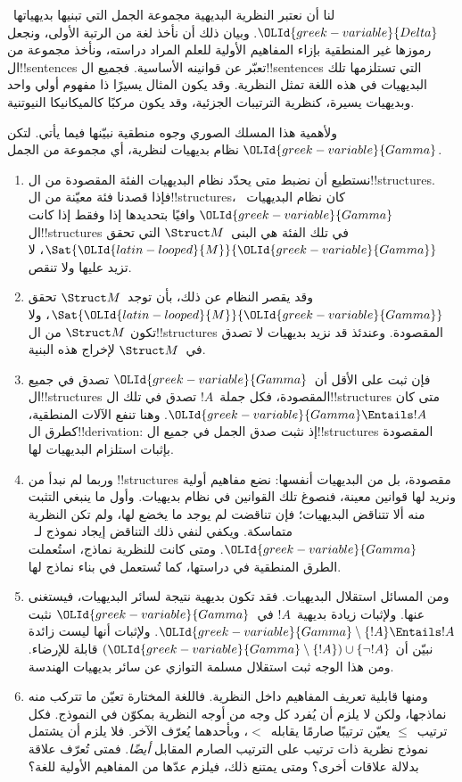 \documentclass[../../../include/open-logic-section]{subfiles}
\begin{document}
\begin{explain}
لنا أن نعتبر النظرية البديهية مجموعة الجمل التي تبنيها
بديهياتها~$\OLId{greek-variable}{Delta}$. وبيان ذلك أن نأخذ لغة من الرتبة الأولى،
ونجعل رموزها غير المنطقية بإزاء المفاهيم الأولية للعلم المراد
دراسته، ونأخذ مجموعة من ال!!{sentence}s تعبّر عن قوانينه الأساسية.
فجميع ال!!{sentence}s التي تستلزمها تلك البديهيات في هذه اللغة
تمثل النظرية. وقد يكون المثال يسيرًا ذا مفهوم أولي واحد وبديهيات
يسيرة، كنظرية الترتيبات الجزئية، وقد يكون مركبًا كالميكانيكا
النيوتنية.

ولأهمية هذا المسلك الصوري وجوه منطقية نبيّنها فيما يأتي.
لتكن $\OLId{greek-variable}{Gamma}$ نظام بديهيات لنظرية، أي مجموعة من الجمل.
\begin{enumerate}
\item نستطيع أن نضبط متى يحدّد نظام البديهيات الفئة المقصودة من
  ال!!{structure}s. فإذا قصدنا فئة معيّنة من ال!!{structure}s،
  كان نظام البديهيات~$\OLId{greek-variable}{Gamma}$ وافيًا بتحديدها إذا وفقط إذا كانت
  ال!!{structure}s في تلك الفئة هي البنى~$\Struct M$ التي تحقق
  $\Sat{\OLId{latin-looped}{M}}{\OLId{greek-variable}{Gamma}}$، لا تزيد عليها ولا تنقص.
\item وقد يقصر النظام عن ذلك، بأن توجد~$\Struct M$ تحقق
  $\Sat{\OLId{latin-looped}{M}}{\OLId{greek-variable}{Gamma}}$، ولا تكون $\Struct M$ من ال!!{structure}s
  المقصودة. وعندئذ قد نزيد بديهيات لا تصدق
  في~$\Struct M$ لإخراج هذه البنية.
\item فإن ثبت على الأقل أن~$\OLId{greek-variable}{Gamma}$ تصدق في جميع
  ال!!{structure}s المقصودة، فكل جملة~$!A$ تصدق في تلك
  ال!!{structure}s متى كان $\OLId{greek-variable}{Gamma} \Entails !A$. وهنا تنفع
  الآلات المنطقية، كطرق ال!!{derivation}: إذ نثبت صدق الجمل
  في جميع ال!!{structure}s المقصودة بإثبات استلزام البديهيات لها.
\item وربما لم نبدأ من !!{structure}s مقصودة، بل من البديهيات
  أنفسها: نضع مفاهيم أولية ونريد لها قوانين معينة، فنصوغ تلك
  القوانين في نظام بديهيات. وأول ما ينبغي التثبت منه ألا تتناقض
  البديهيات؛ فإن تناقضت لم يوجد ما يخضع لها، ولم تكن النظرية
  متماسكة. ويكفي لنفي ذلك التناقض إيجاد نموذج
  لـ~$\OLId{greek-variable}{Gamma}$. ومتى كانت للنظرية نماذج، استُعملت الطرق المنطقية
  في دراستها، كما تُستعمل في بناء نماذج لها.
\item ومن المسائل استقلال البديهيات. فقد تكون بديهية نتيجة
  لسائر البديهيات، فيستغنى عنها. ولإثبات زيادة بديهية~$!A$
  في~$\OLId{greek-variable}{Gamma}$ نثبت
  $\OLId{greek-variable}{Gamma} \setminus \{!A\} \Entails !A$. ولإثبات أنها ليست زائدة
  نبيّن أن
  $(\OLId{greek-variable}{Gamma} \setminus \{!A\}) \cup \{\lnot !A\}$ قابلة للإرضاء.
  ومن هذا الوجه ثبت استقلال مسلمة التوازي عن سائر بديهيات
  الهندسة.
\item ومنها قابلية تعريف المفاهيم داخل النظرية. فاللغة المختارة
  تعيّن ما تتركب منه نماذجها، ولكن لا يلزم أن يُفرد كل وجه من
  أوجه النظرية بمكوّن في النموذج. فكل ترتيب~$\le$ يعيّن ترتيبًا
  صارمًا يقابله~$<$، وبأحدهما يُعرّف الآخر. فلا يلزم أن يشتمل
  نموذج نظرية ذات ترتيب على الترتيب الصارم المقابل
  \emph{أيضًا}. فمتى تُعرّف علاقة بدلالة علاقات أخرى؟ ومتى يمتنع
  ذلك، فيلزم عدّها من المفاهيم الأولية للغة؟
\end{enumerate}
\end{explain}
\end{document}
